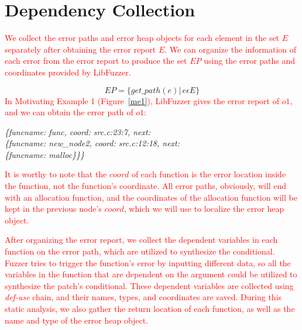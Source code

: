 \documentclass[a4paper,11pt,oneside,openany]{book}
\begin{document}
\section{Dependency Collection}

\textcolor{red}{
We collect the error paths and error heap objects for each element in the set $E$ separately after obtaining the error report $E$. We can organize the information of each error from the error report to produce the set $EP$ using the error paths and coordinates provided by LibFuzzer. 
}

\begin{equation}
EP=\{get\_path(e)|\, e \epsilon E\}
\end{equation}
\textcolor{red}{
In Motivating Example 1 (Figure~\ref{me1}), LibFuzzer gives the error report of $o1$, and we can obtain the error path of $o1$:
}

\begin{minipage}{\textwidth}
\vspace{0.2cm}
\textsl{\hspace{0.3cm}\{funcname: func, coord: src.c:23:7, next:\\\hspace{0.6cm}\{funcname: new\_node2, coord: src.c:12:18, next:\\\hspace{0.9cm}\{funcname: malloc\}\}\}}
\vspace{0.2cm}
\end{minipage}
\textcolor{red}{
It is worthy to note that the $coord$ of each function is the error location inside the function, not the function's coordinate. All error paths, obviously, will end with an allocation function, and the coordinates of the allocation function will be kept in the previous node's $coord$, which we will use to localize the error heap object.
}

\textcolor{red}{
After organizing the error report, we collect the dependent variables in each function on the error path, which are utilized to synthesize the conditional. Fuzzer tries to trigger the function's error by inputting different data, so all the variables in the function that are dependent on the argument could be utilized to synthesize the patch's conditional. These dependent variables are collected using {\it def-use} chain, and their names, types, and coordinates are saved. During this static analysis, we also gather the return location of each function, as well as the name and type of the error heap object.
}
\end{document}
